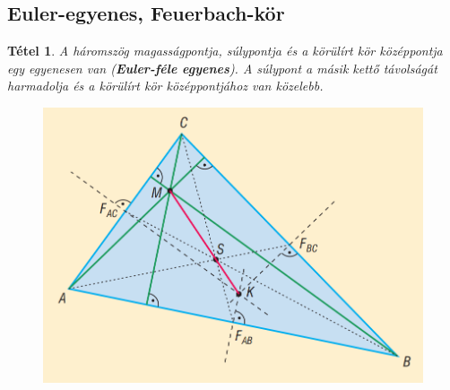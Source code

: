 \documentclass[12pt,a4paper]{article}
\newtheorem{theorem}{Tétel} [section]
\begin{document}
\subsection{Euler-egyenes, Feuerbach-kör}

\begin{theorem}
A háromszög magasságpontja, súlypontja és a körülírt kör középpontja egy egyenesen van (\textbf{Euler-féle egyenes}). A súlypont a másik kettő távolságát harmadolja és a körülírt kör középpontjához van közelebb.
\begin{figure}[h]
\centering
\includegraphics[scale=0.4]{geometry/euler_egyenes}
\end{figure}

\end{theorem}
\end{document}
